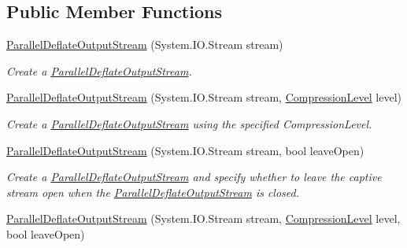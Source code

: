 \subsection*{Public Member Functions}
\begin{DoxyCompactItemize}
\item 
\mbox{\hyperlink{class_super_tiled2_unity_1_1_ionic_1_1_zlib_1_1_parallel_deflate_output_stream_aba84c882116b0dbb99bdc1d939e50b0c}{Parallel\+Deflate\+Output\+Stream}} (System.\+I\+O.\+Stream stream)
\begin{DoxyCompactList}\small\item\em Create a \mbox{\hyperlink{class_super_tiled2_unity_1_1_ionic_1_1_zlib_1_1_parallel_deflate_output_stream}{Parallel\+Deflate\+Output\+Stream}}. \end{DoxyCompactList}\item 
\mbox{\hyperlink{class_super_tiled2_unity_1_1_ionic_1_1_zlib_1_1_parallel_deflate_output_stream_ab6f3d4c9dfd0254ef2d81f336abf6fa0}{Parallel\+Deflate\+Output\+Stream}} (System.\+I\+O.\+Stream stream, \mbox{\hyperlink{namespace_super_tiled2_unity_1_1_ionic_1_1_zlib_a20f6771804996c363f454ad9765cd7db}{Compression\+Level}} level)
\begin{DoxyCompactList}\small\item\em Create a \mbox{\hyperlink{class_super_tiled2_unity_1_1_ionic_1_1_zlib_1_1_parallel_deflate_output_stream}{Parallel\+Deflate\+Output\+Stream}} using the specified Compression\+Level. \end{DoxyCompactList}\item 
\mbox{\hyperlink{class_super_tiled2_unity_1_1_ionic_1_1_zlib_1_1_parallel_deflate_output_stream_a9f0cfccd3f24fe7f55df63759d21934f}{Parallel\+Deflate\+Output\+Stream}} (System.\+I\+O.\+Stream stream, bool leave\+Open)
\begin{DoxyCompactList}\small\item\em Create a \mbox{\hyperlink{class_super_tiled2_unity_1_1_ionic_1_1_zlib_1_1_parallel_deflate_output_stream}{Parallel\+Deflate\+Output\+Stream}} and specify whether to leave the captive stream open when the \mbox{\hyperlink{class_super_tiled2_unity_1_1_ionic_1_1_zlib_1_1_parallel_deflate_output_stream}{Parallel\+Deflate\+Output\+Stream}} is closed. \end{DoxyCompactList}\item 
\mbox{\hyperlink{class_super_tiled2_unity_1_1_ionic_1_1_zlib_1_1_parallel_deflate_output_stream_a62fdb9a350dbbf5a5171e6dd8d294c33}{Parallel\+Deflate\+Output\+Stream}} (System.\+I\+O.\+Stream stream, \mbox{\hyperlink{namespace_super_tiled2_unity_1_1_ionic_1_1_zlib_a20f6771804996c363f454ad9765cd7db}{Compression\+Level}} level, bool leave\+Open)

\end{DoxyCompactItemize}
